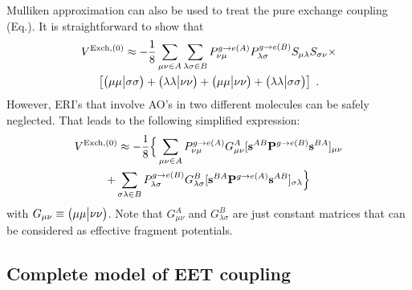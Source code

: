 Mulliken approximation can also be used to treat the pure exchange coupling (Eq.).
It is straightforward to show that
%
\begin{multline}\label{e:v0-exch-mulliken}
V^{{\rm Exch},(0)} \approx -\frac{1}{8} \sum_{\mu\nu\in A} \sum_{\lambda\sigma\in B} 
 P_{\nu\mu}^{g\rightarrow e(A)} P_{\lambda\sigma}^{g\rightarrow e(B)} 
 S_{\mu\lambda}  S_{\sigma\nu} \times \\
 \left[ \bigl( {\mu\mu} \bigl\lvert {\sigma\sigma} \bigr) + \bigl( {\lambda\lambda} \bigl\lvert {\nu\nu} \bigr) 
      + \bigl( {\mu\mu} \bigl\lvert {\nu\nu} \bigr) + \bigl( {\lambda\lambda} \bigl\lvert {\sigma\sigma} \bigr)\right] \;.
\end{multline}
%
However, ERI's that involve AO's in two different molecules can be safely neglected.
That leads to the following simplified expression:
%
\begin{multline}\label{e:v0-exch.mulliken.working}
V^{{\rm Exch},(0)} \approx 
  -\frac{1}{8} \Big\{ \sum_{\mu\nu\in A} P_{\nu\mu}^{g\rightarrow e(A)} G_{\mu\nu}^A
    [{\bf s}^{AB} {\bf P}^{g\rightarrow e(B)} {\bf s}^{BA} ]_{\mu\nu} \\
  + \sum_{\sigma\lambda\in B} P_{\lambda\sigma}^{g\rightarrow e(B)} G_{\lambda\sigma}^B
    [{\bf s}^{BA} {\bf P}^{g\rightarrow e(A)} {\bf s}^{AB} ]_{\sigma\lambda} 
  \Big\}
\end{multline}
%
with $G_{\mu\nu} \equiv \bigl( {\mu\mu} \bigl\lvert {\nu\nu} \bigr)$. Note that $G_{\mu\nu}^A$ and $G_{\lambda\sigma}^B$
are just constant matrices that can be considered as effective fragment potentials.

\subsection{\label{s:2.4}Complete model of EET coupling}

